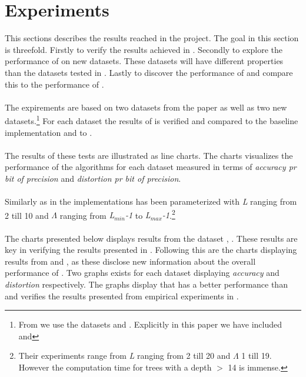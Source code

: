 \section{Experiments}
\label{results}
This sections describes the results reached in the project. The goal in this section is threefold. Firstly to verify the results achieved in \cite{wagner17}. Secondly to explore the performance of \qs{} on new datasets. These datasets will have different properties than the datasets tested in \cite{wagner17}. Lastly to discover the performance of \qsr{} and compare this to the performance of \qs{}. 
\\
\\
The expirements are based on two datasets from the paper as well as two new datasets.\footnote{From \cite{wagner17} we use the datasets \sift{} and \mnist{}. Explicitly in this paper we have included \clust{} and \gist{}} For each dataset the results of \qs{} is verified and compared to the baseline implementation \gr{} and to \qsr{}. 
\\
\\
The results of these tests are illustrated as line charts. The charts visualizes the performance of the algorithms for each dataset measured in terms of \textit{accuracy pr bit of precision} and \textit{distortion pr bit of precision}. 
\\
\\
Similarly as in \cite{wagner17} the \qs{} implementations has been parameterized with \textit{L} ranging from 2 till 10 and $\Lambda$ ranging from \textit{L$_{min}$-1} to \textit{L$_{max}$-1}.\footnote{Their experiments range from \textit{L} ranging from 2 till 20 and $\Lambda$ 1 till 19. However the computation time for trees with a depth $>$ 14 is immense.} 
\\
\\
The charts presented below displays results from the dataset \sift{}, \mnist{}. These results are key in verifying the results presented in \cite{wagner17}. Following this are the charts displaying results from \clust{} and \gist{}, as these disclose new information about the overall performance of \qs{}. Two graphs exists for each dataset displaying \textit{accuracy} and \textit{distortion} respectively. The graphs display that \qs{} has a better performance than \grid{} and verifies the results presented from empirical experiments in \cite{wagner17}.

